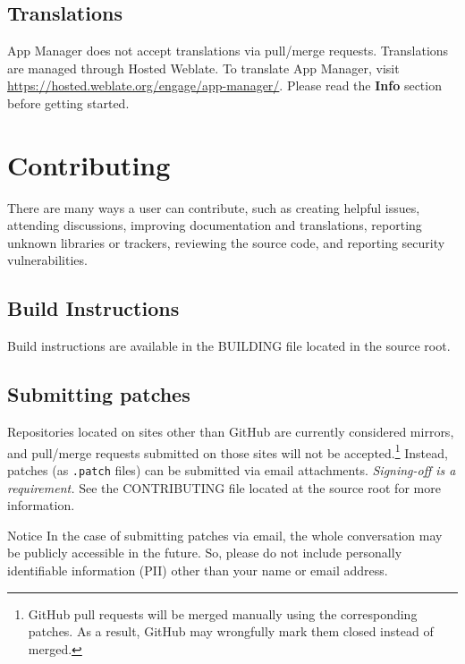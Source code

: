 \subsection{Translations}\label{subsec:translations} %
App Manager does not accept translations via pull/merge requests. Translations are managed through
Hosted Weblate. To translate App Manager, visit \url{https://hosted.weblate.org/engage/app-manager/}.
Please read the \textbf{Info} section before getting started.


\section{Contributing}\label{sec:contributing} %
There are many ways a user can contribute, such as creating helpful issues, attending discussions,
improving documentation and translations, reporting unknown libraries or trackers, reviewing the source code,
and reporting security vulnerabilities.

\subsection{Build Instructions}\label{subsec:build-instructions} %
Build instructions are available in the BUILDING file located in the source root.

\subsection{Submitting patches}\label{subsec:submitting-patches} %
Repositories located on sites other than GitHub are currently considered mirrors, and pull/merge requests submitted on
those sites will not be accepted.\footnote{GitHub pull requests will be merged manually using the corresponding patches.
As a result, GitHub may wrongfully mark them closed instead of merged.} Instead, patches (as \texttt{.patch} files) can
be submitted via email attachments. \textit{Signing-off is a requirement.} See the CONTRIBUTING file
located at the source root for more information.

\begin{warning}{Notice}
    In the case of submitting patches via email, the whole conversation may be publicly accessible in the future.
    So, please do not include personally identifiable information (PII) other than your name or email address.
\end{warning}


